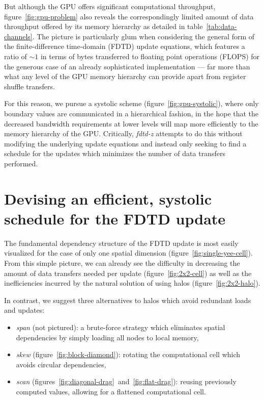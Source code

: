 \documentclass[12pt]{article}
\newcommand{\fdtdz}{\mbox{\emph{fdtd-z}}}  %
\begin{document}
But although the GPU offers significant computational throughput,
  figure~\ref{fig:gpu-problem} also reveals
  the correspondingly limited amount of data throughput
  offered by its memory hierarchy as detailed in table~\ref{tab:data-channels}.
The picture is particularly glum when considering
  the general form of the finite-difference time-domain (FDTD) update equations,
  which features a ratio of $\sim 1$
  in terms of bytes transferred to floating point operations (FLOPS)
  for the generous case of an already sophisticated implementation
  --- far more than what any level of the GPU memory hierarchy can provide
  apart from register shuffle transfers.

For this reason,
  we pursue a systolic scheme (figure~\ref{fig:gpu-systolic}),
  where only boundary values are communicated in a hierarchical fashion,
  in the hope that the decreased bandwidth requirements at lower levels
  will map more efficiently to the memory hierarchy of the GPU.
Critically,
  {\fdtdz} attempts to do this without modifying the underlying update equations
  and instead only seeking to find a schedule for the updates 
  which minimizes the number of data transfers performed.

\section{Devising an efficient, systolic schedule for the FDTD update}
The fundamental dependency structure of the FDTD update
  is most easily visualized for the case of only one spatial dimension
  (figure~\ref{fig:single-yee-cell}).
From this simple picture,
  we can already see the difficulty
  in decreasing the amount of data transfers needed per update 
  (figure~\ref{fig:2x2-cell})
  as well as the inefficiencies incurred by the natural solution of using halos
  (figure~\ref{fig:2x2-halo}).

In contrast, we suggest three alternatives to halos
  which avoid redundant loads and updates:
\begin{itemize}
  \item \emph{span} (not pictured):
        a brute-force strategy which eliminates spatial dependencies
        by simply loading all nodes to local memory,
  \item \emph{skew} (figure~\ref{fig:block-diamond}):
        rotating the computational cell which avoids circular dependencies,
  \item \emph{scan} (figures~\ref{fig:diagonal-drag}~and~\ref{fig:flat-drag}):
        reusing previously computed values,
        allowing for a flattened computational cell.
\end{itemize}
\end{document}
